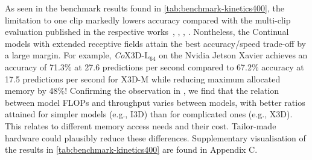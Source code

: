 As seen in the benchmark results found in \cref{tab:benchmark-kinetics400},
the limitation to one clip markedly lowers accuracy compared with the multi-clip evaluation published in the respective works~\cite{carreira2017quo}, \cite{tran2018closer}, \cite{feichtenhofer2019slowfast}, \cite{feichtenhofer2020x3d}.
Nontheless, the Continual models with extended receptive fields attain the best accuracy/speed trade-off by a large margin. 
For example, \textit{Co}X3D-$\text{L}_{64}$ on the Nvidia Jetson Xavier achieves an accuracy of 71.3\% at 27.6 predictions per second compared to 67.2\% accuracy at 17.5 predictions per second for X3D-M while reducing maximum allocated memory by 48\%! 
%
Confirming the observation in \cite{ma2018shufflenetv2}, we find that the relation between model FLOPs and throughput varies between models, with better ratios attained for simpler models (e.g., I3D) than for complicated ones (e.g., X3D). 
This relates to different memory access needs and their cost. Tailor-made hardware could plausibly reduce these differences.
Supplementary visualisation of the results in \cref{tab:benchmark-kinetics400} are found in Appendix C.
%








